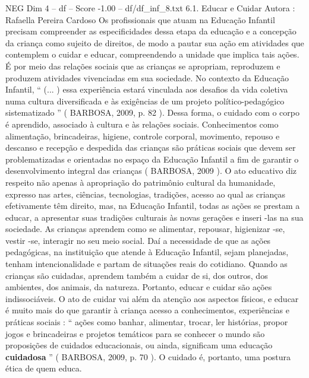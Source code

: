\begin{textsample}{NEG Dim 4 – df – Score -1.00 – df/df\_inf\_8.txt}  \label{ex:f4_neg_065}
6.1.
Educar e Cuidar Autora : Rafaella Pereira Cardoso Os profissionais que atuam na Educação Infantil precisam compreender as especificidades dessa etapa da educação e a concepção da criança como sujeito de direitos, de modo a pautar sua ação em atividades que contemplem o cuidar e educar, compreendendo a unidade que implica tais ações.
É por meio das relações sociais que as crianças se apropriam, reproduzem e produzem atividades vivenciadas em sua sociedade.
No contexto da Educação Infantil, “ (... ) essa experiência estará vinculada aos desafios da vida coletiva numa cultura diversificada e às exigências de um projeto político-pedagógico sistematizado ” ( BARBOSA, 2009, p. 82 ).
Dessa forma, o cuidado com o corpo é aprendido, associado à cultura e às relações sociais.
Conhecimentos como alimentação, brincadeiras, higiene, controle corporal, movimento, repouso e descanso e recepção e despedida das crianças são práticas sociais que devem ser problematizadas e orientadas no espaço da Educação Infantil a fim de garantir o desenvolvimento integral das crianças ( BARBOSA, 2009 ).
O ato educativo diz respeito não apenas à apropriação do patrimônio cultural da humanidade, expresso nas artes, ciências, tecnologias, tradições, acesso ao qual as crianças efetivamente têm direito, mas, na Educação Infantil, todas as ações se prestam a educar, a apresentar suas tradições culturais às novas gerações e inseri -las na sua sociedade.
As crianças aprendem como se alimentar, repousar, higienizar -se, vestir -se, interagir no seu meio social.
Daí a necessidade de que as ações pedagógicas, na instituição que atende à Educação Infantil, sejam planejadas, tenham intencionalidade e partam de situações reais do cotidiano.
Quando as crianças são cuidadas, aprendem também a cuidar de si, dos outros, dos ambientes, dos animais, da natureza.
Portanto, educar e cuidar são ações indissociáveis.
O ato de cuidar vai além da atenção aos aspectos físicos, e educar é muito mais do que garantir à criança acesso a conhecimentos, experiências e práticas sociais : “ ações como banhar, alimentar, trocar, ler histórias, propor jogos e brincadeiras e projetos temáticos para se conhecer o mundo são proposições de cuidados educacionais, ou ainda, significam uma educação \textbf{cuidadosa} ” ( BARBOSA, 2009, p. 70 ).
O cuidado é, portanto, uma postura ética de quem educa.

\end{textsample}
